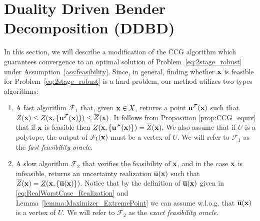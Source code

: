 \documentclass[12pt,x11names]{article}
\theoremstyle{definition}
\newcommand{\bu}{{\bf u}}
\newcommand{\bx}{{\bf x}}
\begin{document}
\section{Duality Driven Bender Decomposition (DDBD)}\label{sec:DDBD}
In this section, we will describe a modification of the CCG algorithm which guarantees convergence to an optimal solution of Problem~\eqref{eq:2stage_robust} under Assumption~\ref{ass:feasibility}. Since, in general, finding whether $\bx$ is feasible for Problem~\eqref{eq:2stage_robust} is a hard problem, our method utilizes two types algorithms:
\begin{enumerate}
\item A fast algorithm $\mathcal{F}_1$ that, given $\bx\in X$, returns a point $\bu^{\mathcal{F}}(\bx)$ 
such that $\tilde{Z}(\bx)\leq \underline{Z}(\bx,\{\bu^{\mathcal{F}}(\bx)\})\leq \overline{Z}(\bx)$. It follows from Proposition \ref{prop:CCG_equiv} that if $\bx$ is feasible then $\underline{Z}(\bx,\{\bu^{\mathcal{F}}(\bx)\})= \overline{Z}(\bx)$. We also assume that if $U$ is a polytope, the output of $\mathcal{F}_1(\bx)$ must be a vertex of $U$. We will refer to $\mathcal{F}_1$ as the \emph{fast feasibility oracle}.
\item A slow algorithm $\mathcal{F}_2$ that verifies the feasibility of $\bx$, and in the case $\bx$ is infeasible, returns an uncertainty realization $\overline{\bu}(\bx)$ such that $\overline{Z}(\bx)=\underline{Z}(\bx,\{\overline{\bu}(\bx)\})$. Notice that by the definition of $\overline{\bu}(\bx)$ given in \eqref{eq:RealWorstCase_Realization} and Lemma~\ref{lemma:Maximizer_ExtremePoint} we can assume w.l.o.g. that
$\overline{\bu}(\bx)$ is a vertex of $U$. We will refer to $\mathcal{F}_2$ as the \emph{exact feasibility oracle}.
\end{enumerate}
\end{document}

